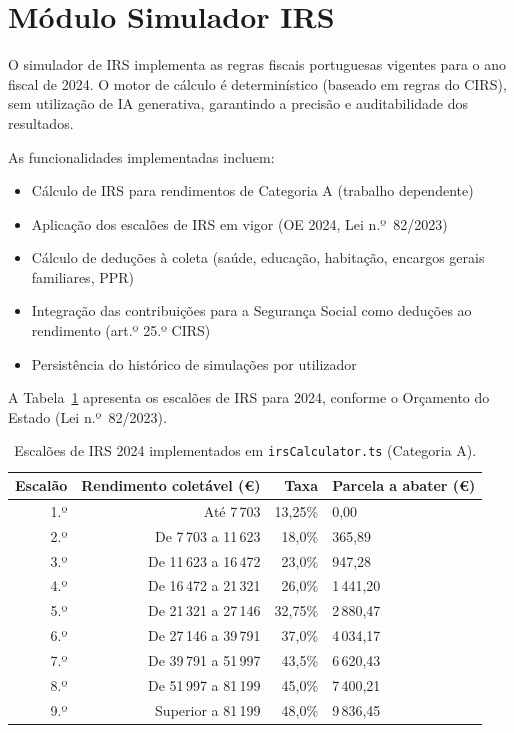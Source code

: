 \section{Módulo Simulador IRS}
\label{sec:impl-irs}

O simulador de \ac{IRS} implementa as regras fiscais portuguesas vigentes para o ano fiscal de 2024. O motor de cálculo é determinístico (baseado em regras do \ac{CIRS}), sem utilização de \ac{IA} generativa, garantindo a precisão e auditabilidade dos resultados.

As funcionalidades implementadas incluem:
\begin{itemize}
    \item Cálculo de \ac{IRS} para rendimentos de Categoria A (trabalho dependente)
    \item Aplicação dos escalões de \ac{IRS} em vigor (OE 2024, Lei n.º~82/2023)
    \item Cálculo de deduções à coleta (saúde, educação, habitação, encargos gerais familiares, PPR)
    \item Integração das contribuições para a Segurança Social como deduções ao rendimento (art.º 25.º \ac{CIRS})
    \item Persistência do histórico de simulações por utilizador
\end{itemize}

A Tabela~\ref{tab:escaloes-irs-2024} apresenta os escalões de \ac{IRS} para 2024, conforme o Orçamento do Estado (Lei n.º~82/2023).

\begin{table}[H]
\centering
\caption{Escalões de IRS 2024 implementados em \texttt{irsCalculator.ts} (Categoria A).}
\label{tab:escaloes-irs-2024}
\small
\begin{tabularx}{\textwidth}{r r r X}
\toprule
\textbf{Escalão} & \textbf{Rendimento coletável (€)} & \textbf{Taxa} & \textbf{Parcela a abater (€)} \\
\midrule
1.º & Até 7\,703 & 13,25\% & 0,00 \\
2.º & De 7\,703 a 11\,623 & 18,0\% & 365,89 \\
3.º & De 11\,623 a 16\,472 & 23,0\% & 947,28 \\
4.º & De 16\,472 a 21\,321 & 26,0\% & 1\,441,20 \\
5.º & De 21\,321 a 27\,146 & 32,75\% & 2\,880,47 \\
6.º & De 27\,146 a 39\,791 & 37,0\% & 4\,034,17 \\
7.º & De 39\,791 a 51\,997 & 43,5\% & 6\,620,43 \\
8.º & De 51\,997 a 81\,199 & 45,0\% & 7\,400,21 \\
9.º & Superior a 81\,199 & 48,0\% & 9\,836,45 \\
\bottomrule
\end{tabularx}
\end{table}


